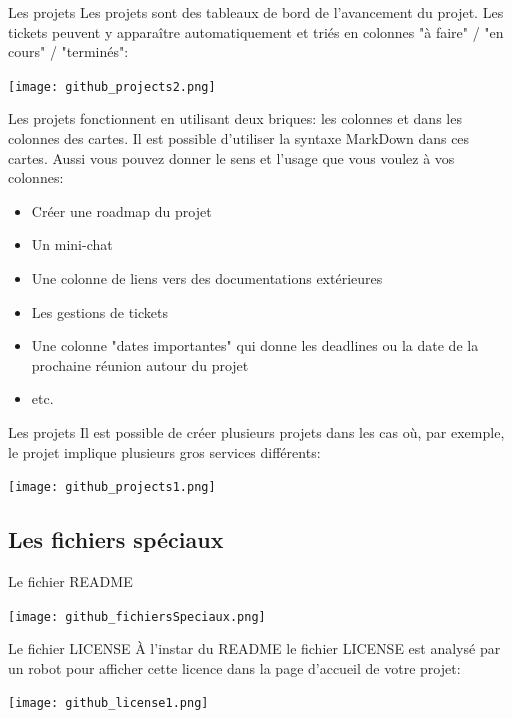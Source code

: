 \documentclass{beamer}
\begin{document}
\begin{frame}{Les projets}
Les projets sont des tableaux de bord de l'avancement du projet. Les tickets peuvent y apparaître automatiquement et triés en colonnes "à faire" / "en cours" / "terminés":
\begin{center}
	\texttt{[image: github\_projects2.png]}
\end{center}
\end{frame}

\begin{frame}
Les projets fonctionnent en utilisant deux briques: les colonnes et dans les colonnes des cartes. Il est possible d'utiliser la syntaxe MarkDown dans ces cartes. Aussi vous pouvez donner le sens et l'usage que vous voulez à vos colonnes:\\
\medskip

\begin{itemize}
	\item Créer une roadmap du projet
	\item Un mini-chat
	\item Une colonne de liens vers des documentations extérieures
	\item Les gestions de tickets
	\item Une colonne "dates importantes" qui donne les deadlines ou la date de la prochaine réunion autour du projet
	\item etc.
\end{itemize}
\end{frame}

\begin{frame}{Les projets}
Il est possible de créer plusieurs projets dans les cas où, par exemple, le projet implique plusieurs gros services différents:
\begin{center}
	\texttt{[image: github\_projects1.png]}
\end{center}
\end{frame}


\subsection{Les fichiers spéciaux}
\begin{frame}{Le fichier README}
\begin{center}
	\texttt{[image: github\_fichiersSpeciaux.png]}
\end{center}
\end{frame}


\begin{frame}{Le fichier LICENSE}
À l'instar du README le fichier LICENSE est analysé par un robot pour afficher cette licence dans la page d'accueil de votre projet:
\begin{center}
	\texttt{[image: github\_license1.png]}
\end{center}
\end{frame}
\end{document}
